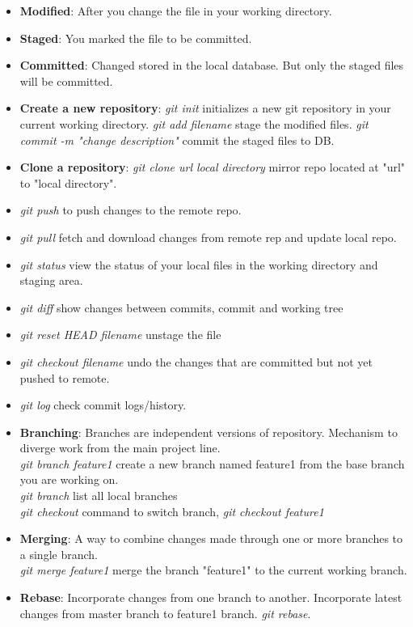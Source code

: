 \documentclass[a4paper]{article}
\begin{document}
\begin{itemize}
    \item \textbf{Modified}: After you change the file in your working directory.
    \item \textbf{Staged}: You marked the file to be committed.
    \item \textbf{Committed}: Changed stored in the local database. But only the staged files will be committed.
    \item \textbf{Create a new repository}: \textit{git init} initializes a new git repository in your current working directory. \textit{git add filename} stage the modified files. \textit{git commit -m "change description"} commit the staged files to DB.
    \item \textbf{Clone a repository}: \textit{git clone url local directory} mirror repo located at "url" to "local directory".
    \item \textit{git push} to push changes to the remote repo.
    \item \textit{git pull} fetch and download changes from remote rep and update local repo.
    \item \textit{git status} view the status of your local files in the working directory and staging area.
    \item \textit{git diff} show changes between commits, commit and working tree
    \item \textit{git reset HEAD filename} unstage the file
    \item \textit{git checkout filename} undo the changes that are committed but not yet pushed to remote.
    \item \textit{git log} check commit logs/history.
    \item \textbf{Branching}: Branches are independent versions of repository. Mechanism to diverge work from the main project line.\\
    \textit{git branch feature1} create a new branch named feature1 from the base branch you are working on.\\
    \textit{git branch} list all local branches\\
    \textit{git checkout} command to switch branch, \textit{git checkout feature1}
    \item \textbf{Merging}: A way to combine changes made through one or more branches to a single branch.\\
    \textit{git merge feature1} merge the branch "feature1" to the current working branch.
    \item \textbf{Rebase}: Incorporate changes from one branch to another. Incorporate latest changes from master branch to feature1 branch. \textit{git rebase}.

\end{itemize}
\end{document}
